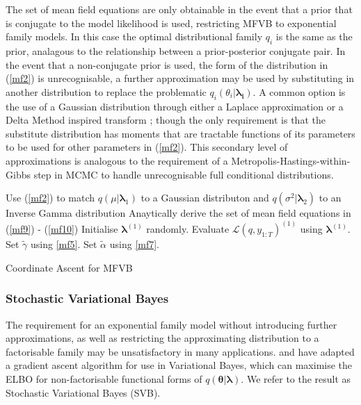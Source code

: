 \documentclass[12pt,a4paper]{article}%
\numberwithin{equation}{section}
\begin{document}
The set of mean field equations are only obtainable in the event that a prior that is conjugate to the model likelihood is used, restricting MFVB to exponential family models. In this case the optimal distributional family $q_i$ is the same as the prior, analagous to the relationship between a prior-posterior conjugate pair. In the event that a non-conjugate prior is used, the form of the distribution in (\ref{mf2}) is unrecognisable, a further approximation may be used by substituting in another distribution to replace the problematic $q_i(\theta_i |\boldsymbol{\lambda_i}).$ A common option is the use of a Gaussian distribution through either a Laplace approximation \citep{Friston2006} or a Delta Method inspired transform \citet{Wang2013}; though the only requirement is that the substitute distribution has moments that are tractable functions of its parameters to be used for other parameters in (\ref{mf2}). This secondary level of approximations is analogous to the requirement of a Metropolis-Hastings-within-Gibbs step in MCMC to handle unrecognisable full conditional distributions.

\vspace{5mm}
\begin{algorithm}[H]
 Use (\ref{mf2}) to match $q(\mu|\boldsymbol{\lambda}_1)$ to a Gaussian distributon and $q(\sigma^2 | \boldsymbol{\lambda}_2)$ to an Inverse Gamma distribution\;
 Anaytically derive the set of mean field equations in (\ref{mf9}) - (\ref{mf10})\;
 Initialise $\boldsymbol{\lambda}^{(1)}$ randomly.\;
 Evaluate $\mathcal{L}(q, y_{1:T})^{(1)}$ using $\boldsymbol{\lambda}^{(1)}$.\;
 Set $\tilde{\gamma}$ using \ref{mf5}.\;
 Set $\tilde{\alpha}$ using \ref{mf7}.\;
 \caption{Coordinate Ascent for MFVB}
  \label{alg:algorithm1}
\end{algorithm}

\subsubsection{Stochastic Variational Bayes}

The requirement for an exponential family model without introducing further approximations, as well as restricting the approximating distribution to a factorisable family may be unsatisfactory in many applications. \citet{Paisley2012} and \citet{Ranganath2014} have adapted a gradient ascent algorithm for use in Variational Bayes, which can maximise the ELBO for non-factorisable functional forms of $q(\boldsymbol{\theta} | \boldsymbol{\lambda})$. We refer to the result as Stochastic Variational Bayes (SVB).
\end{document}
